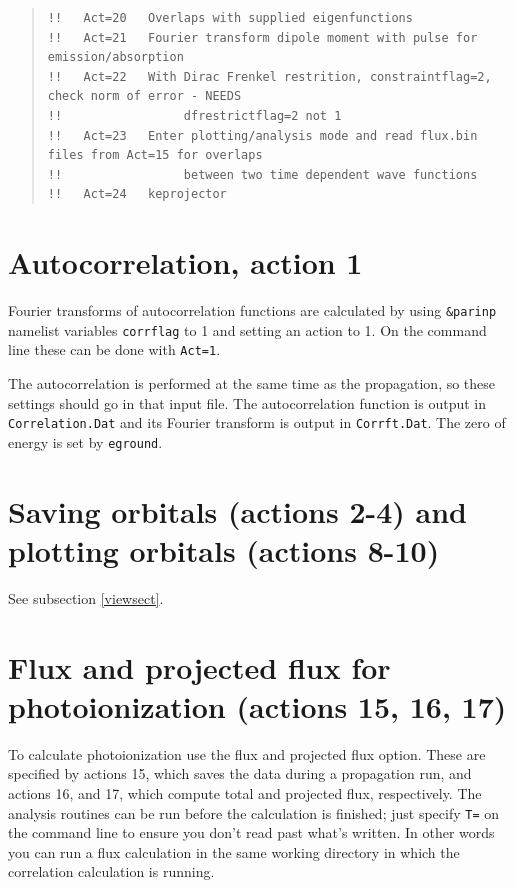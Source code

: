 \documentclass[10pt,leqno, oneside]{book}
\begin{document}
\begin{quote}
{\begin{verbatim}
!!   Act=20   Overlaps with supplied eigenfunctions                                                                                      
!!   Act=21   Fourier transform dipole moment with pulse for emission/absorption                                                         
!!   Act=22   With Dirac Frenkel restrition, constraintflag=2, check norm of error - NEEDS                                               
!!                 dfrestrictflag=2 not 1                                                                                                
!!   Act=23   Enter plotting/analysis mode and read flux.bin files from Act=15 for overlaps                                              
!!                 between two time dependent wave functions                                                                             
!!   Act=24   keprojector  
\end{verbatim}}
\end{quote}


\section{Autocorrelation, action 1}

Fourier transforms of autocorrelation functions are calculated by using \verb#&parinp# namelist variables \verb#corrflag# to 1 and setting an action to 1.  On the command line these can be done with \verb#Act=1#.   

The autocorrelation is performed at the same time as the propagation, so these settings should go in that input file.
 The autocorrelation function is output in \verb#Correlation.Dat# and its Fourier transform is output in \verb#Corrft.Dat#.  The zero of energy is set by \verb#eground#.

\section{Saving orbitals (actions 2-4) and plotting orbitals (actions 8-10)}


See subsection \ref{viewsect}.


\section{Flux and projected flux for photoionization (actions 15, 16, 17)}

To calculate photoionization use the flux and projected flux option.  These are specified by actions 15, which saves the data during a propagation run, and actions 16, and 17, which compute total and projected flux, respectively.  The analysis routines can be run before the calculation is finished; just specify \verb#T=# on the command line to ensure you don't read past what's written.  In other words you can run a flux calculation in the same working directory in which the correlation 
calculation is running.
\end{document}
